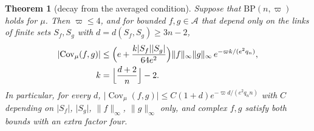 \documentclass[aps,prd,twocolumn,superscriptaddress,nofootinbib,longbibliography,floatfix,amsmath,amssymb,10pt]{revtex4-2}
\newtheorem{theorem}{Theorem}
\theoremstyle{definition}
\theoremstyle{remark}
\newcommand{\Cov}{\operatorname{Cov}}
\begin{document}
\begin{theorem}[decay from the averaged condition]\label{thm:avgdecay}
Suppose that $\mathrm{BP}(n,\varpi)$ holds for $\mu$. Then $\varpi\le4$, and
for bounded $f,g\in\mathcal A$ that depend only on the links of finite sets
$S_f,S_g$ with $d=d(S_f,S_g)\ge3n-2$,
\[
\begin{split}
\lvert\Cov_\mu(f,g)\rvert&\le\Bigl(e+\frac{k\lvert S_f\rvert\lvert S_g
\rvert}{64e^2}\Bigr)\lVert f\rVert_\infty\lVert g\rVert_\infty\,
e^{-\varpi k/(e^2q_n)},\\
k&=\Bigl\lfloor\frac{d+2}n\Bigr\rfloor-2 .
\end{split}
\]
In particular, for every $d$, $\lvert\Cov_\mu(f,g)\rvert\le C(1+d)
e^{-\varpi d/(e^2q_nn)}$ with $C$ depending on $\lvert S_f\rvert$, $\lvert
S_g\rvert$, $\lVert f\rVert_\infty$, $\lVert g\rVert_\infty$ only, and
complex $f,g$ satisfy both bounds with an extra factor four.
\end{theorem}
\end{document}

